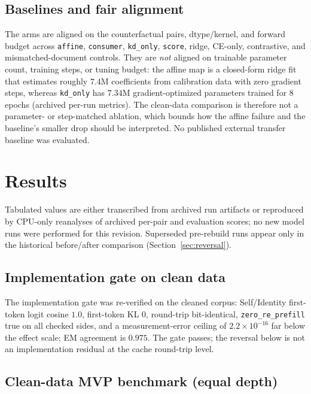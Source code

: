 \documentclass[11pt,a4paper]{article}
\begin{document}
\subsection{Baselines and fair alignment}
\label{sec:baselines}

The arms are aligned on the counterfactual pairs, dtype/kernel, and forward
budget across \texttt{affine}, \texttt{consumer}, \texttt{kd\_only},
\texttt{score}, ridge, CE-only, contrastive, and mismatched-document controls.
They are \emph{not} aligned on trainable parameter count, training steps, or
tuning budget: the affine map is a closed-form ridge fit that estimates roughly
$7.4$M coefficients from calibration data with zero gradient steps, whereas
\texttt{kd\_only} has $7.34$M gradient-optimized parameters trained for $8$
epochs (archived per-run metrics). The clean-data comparison is therefore not a
parameter- or step-matched ablation, which bounds how the affine failure and
the baseline's smaller drop should be interpreted. No published external
transfer baseline was evaluated.

\section{Results}
\label{sec:results}

Tabulated values are either transcribed from archived run artifacts or
reproduced by CPU-only reanalyses of archived per-pair and evaluation scores;
no new model runs were performed for this revision. Superseded pre-rebuild runs
appear only in the historical before/after comparison
(Section~\ref{sec:reversal}).

\subsection{Implementation gate on clean data}
\label{sec:e0}

The implementation gate was re-verified on the cleaned corpus: Self/Identity
first-token logit cosine $1.0$, first-token KL $0$, round-trip bit-identical,
\texttt{zero\_re\_prefill} true on all checked sides, and a measurement-error
ceiling of $2.2\times10^{-16}$ far below the effect scale; EM agreement is
$0.975$. The gate passes; the reversal below is not an implementation residual
at the cache round-trip level.

\subsection{Clean-data MVP benchmark (equal depth)}
\label{sec:mvp}
\end{document}
